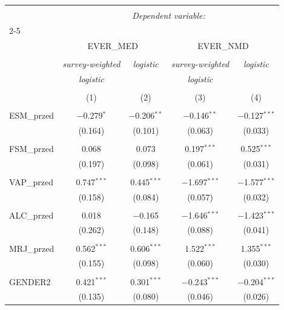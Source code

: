 
\begin{tabular}{@{\extracolsep{5pt}}lcccc} 
\\[-1.8ex]\hline 
\hline \\[-1.8ex] 
 & \multicolumn{4}{c}{\textit{Dependent variable:}} \\ 
\cline{2-5} 
\\[-1.8ex] & \multicolumn{2}{c}{EVER\_MED} & \multicolumn{2}{c}{EVER\_NMD} \\ 
\\[-1.8ex] & \textit{survey-weighted} & \textit{logistic} & \textit{survey-weighted} & \textit{logistic} \\ 
 & \textit{logistic} & \textit{} & \textit{logistic} & \textit{} \\ 
\\[-1.8ex] & (1) & (2) & (3) & (4)\\ 
\hline \\[-1.8ex] 
 ESM\_przed & $-$0.279$^{*}$ & $-$0.206$^{**}$ & $-$0.146$^{**}$ & $-$0.127$^{***}$ \\ 
  & (0.164) & (0.101) & (0.063) & (0.033) \\ 
  & & & & \\ 
 FSM\_przed & 0.068 & 0.073 & 0.197$^{***}$ & 0.525$^{***}$ \\ 
  & (0.197) & (0.098) & (0.061) & (0.031) \\ 
  & & & & \\ 
 VAP\_przed & 0.747$^{***}$ & 0.445$^{***}$ & $-$1.697$^{***}$ & $-$1.577$^{***}$ \\ 
  & (0.158) & (0.084) & (0.057) & (0.032) \\ 
  & & & & \\ 
 ALC\_przed & 0.018 & $-$0.165 & $-$1.646$^{***}$ & $-$1.423$^{***}$ \\ 
  & (0.262) & (0.148) & (0.088) & (0.041) \\ 
  & & & & \\ 
 MRJ\_przed & 0.562$^{***}$ & 0.606$^{***}$ & 1.522$^{***}$ & 1.355$^{***}$ \\ 
  & (0.155) & (0.098) & (0.060) & (0.030) \\ 
  & & & & \\ 
 GENDER2 & 0.421$^{***}$ & 0.301$^{***}$ & $-$0.243$^{***}$ & $-$0.204$^{***}$ \\ 
  & (0.135) & (0.080) & (0.046) & (0.026) \\ 

\end{tabular}
